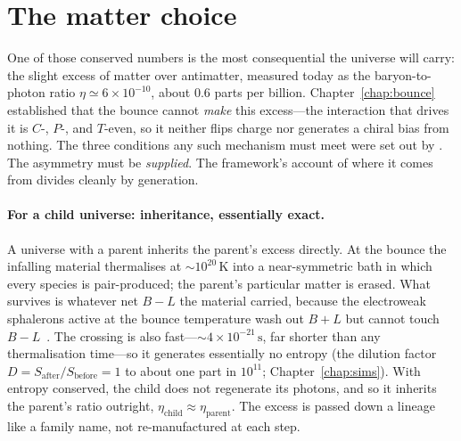 \section{The matter choice}
\label{sec:matter-choice}

One of those conserved numbers is the most consequential the universe will carry:
the slight excess of matter over antimatter, measured today as the
baryon-to-photon ratio $\eta\simeq6\times10^{-10}$, about 0.6 parts per billion.
Chapter~\ref{chap:bounce} established that the bounce cannot \emph{make} this
excess---the interaction that drives it is $C$-, $P$-, and $T$-even, so it neither
flips charge nor generates a chiral bias from nothing. The three conditions any
such mechanism must meet were set out by \citet{sakharov1967}. The asymmetry must be
\emph{supplied}. The framework's account of where it comes from divides cleanly by
generation.

\paragraph{For a child universe: inheritance, essentially exact.} A universe with
a parent inherits the parent's excess directly. At the bounce the infalling
material thermalises at $\sim10^{20}\,\mathrm{K}$ into a near-symmetric bath in
which every species is pair-produced; the parent's particular matter is erased.
What survives is whatever net $B-L$ the material carried, because the electroweak
sphalerons active at the bounce temperature wash out $B+L$ but cannot touch
$B-L$~\citep{kuzmin1985}. The crossing is also fast---$\sim4\times10^{-21}\,\mathrm{s}$, far shorter
than any thermalisation time---so it generates essentially no entropy
(the dilution factor $D=S_{\mathrm{after}}/S_{\mathrm{before}}=1$ to about one part
in $10^{11}$; Chapter~\ref{chap:sims}). With entropy conserved, the child does not
regenerate its photons, and so it inherits the parent's ratio outright,
$\eta_{\mathrm{child}}\approx\eta_{\mathrm{parent}}$. The excess is passed down a
lineage like a family name, not re-manufactured at each step.

